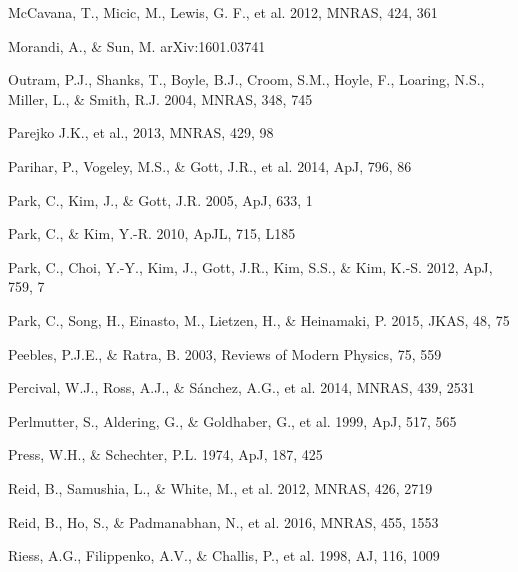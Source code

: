 \documentclass[useAMS,usenatbib]{mnras}
\begin{document}
\begin{thebibliography}{}
McCavana, T., Micic, M., Lewis, G. F., et al. 2012, MNRAS, 424, 361


Morandi, A., \& Sun, M. arXiv:1601.03741


Outram, P.J., Shanks, T., Boyle, B.J., Croom, S.M., Hoyle, F., Loaring, N.S., 
Miller, L., \& Smith, R.J. 2004, MNRAS, 348, 745  


Parejko J.K., et al., 2013, MNRAS, 429, 98

Parihar, P., Vogeley, M.S., \& Gott, J.R., et al. 2014, ApJ, 796, 86

Park, C., Kim, J., \& Gott, J.R. 2005, ApJ, 633, 1  

Park, C., \& Kim, Y.-R. 2010, ApJL, 715, L185  

Park, C., Choi, Y.-Y., Kim, J., Gott, J.R., Kim, S.S., \&
Kim, K.-S. 2012, ApJ, 759, 7

Park, C., Song, H., Einasto, M., Lietzen, H., \&
Heinamaki, P. 2015, JKAS, 48, 75

Peebles, P.J.E., \& Ratra, B. 2003, Reviews of Modern Physics, 75, 559

Percival, W.J., Ross, A.J., \& S\'{a}nchez, A.G., et al. 2014, MNRAS, 439, 2531

Perlmutter, S., Aldering, G., \& Goldhaber, G., et al. 1999, ApJ, 517, 565  

Press, W.H., \& Schechter, P.L. 1974, ApJ, 187, 425



Reid, B., Samushia, L., \& White, M., et al. 2012, MNRAS, 426, 2719  

Reid, B., Ho, S., \& Padmanabhan, N., et al.  2016, MNRAS, 455, 1553

Riess, A.G., Filippenko, A.V., \& Challis, P., et al. 1998, AJ, 116, 1009  


\end{thebibliography}
\end{document}
